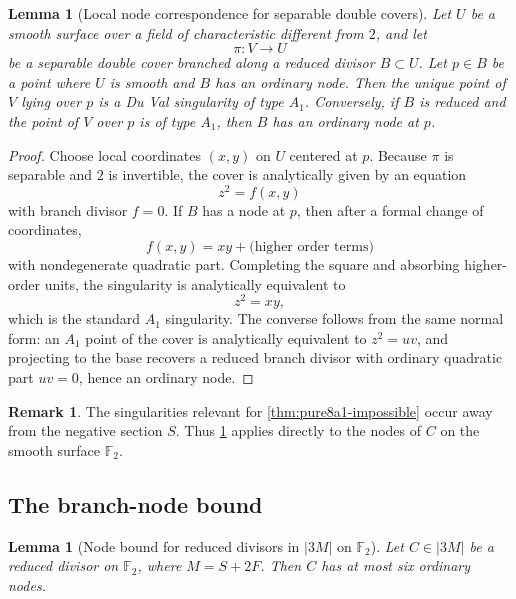 \documentclass[11pt]{article}
\newtheorem{lemma}[theorem]{Lemma}
\theoremstyle{definition}
\newtheorem{remark}[theorem]{Remark}
\begin{document}
\begin{lemma}[Local node correspondence for separable double covers]\label{lem:node-correspondence}
Let $U$ be a smooth surface over a field of characteristic different from $2$, and let
\[
\pi\colon V\to U
\]
be a separable double cover branched along a reduced divisor $B\subset U$. Let $p\in B$ be a point where $U$ is smooth and $B$ has an ordinary node. Then the unique point of $V$ lying over $p$ is a Du Val singularity of type $A_1$. Conversely, if $B$ is reduced and the point of $V$ over $p$ is of type $A_1$, then $B$ has an ordinary node at $p$.
\end{lemma}

\begin{proof}
Choose local coordinates $(x,y)$ on $U$ centered at $p$. Because $\pi$ is separable and $2$ is invertible, the cover is analytically given by an equation
\[
z^2=f(x,y)
\]
with branch divisor $f=0$. If $B$ has a node at $p$, then after a formal change of coordinates,
\[
f(x,y)=xy+\text{(higher order terms)}
\]
with nondegenerate quadratic part. Completing the square and absorbing higher-order units, the singularity is analytically equivalent to
\[
z^2=xy,
\]
which is the standard $A_1$ singularity. The converse follows from the same normal form: an $A_1$ point of the cover is analytically equivalent to $z^2=uv$, and projecting to the base recovers a reduced branch divisor with ordinary quadratic part $uv=0$, hence an ordinary node.
\end{proof}

\begin{remark}
The singularities relevant for \cref{thm:pure8a1-impossible} occur away from the negative section $S$. Thus \cref{lem:node-correspondence} applies directly to the nodes of $C$ on the smooth surface $\mathbb F_2$.
\end{remark}

\subsection{The branch-node bound}

\begin{lemma}[Node bound for reduced divisors in $|3M|$ on $\mathbb F_2$]\label{lem:node-bound}
Let $C\in |3M|$ be a reduced divisor on $\mathbb F_2$, where $M=S+2F$. Then $C$ has at most six ordinary nodes.
\end{lemma}
\end{document}
